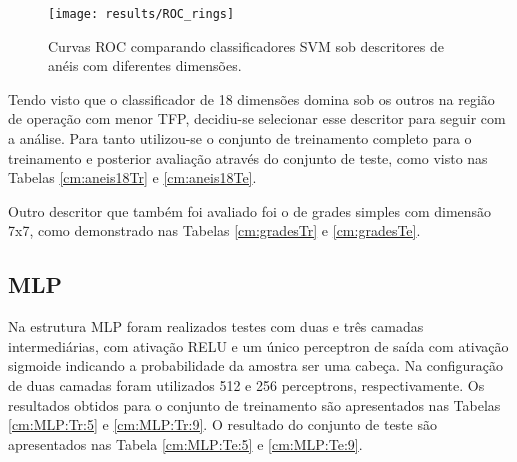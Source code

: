 \begin{table}
\end{table}

\begin{figure}
\centering
\texttt{[image: results/ROC\_rings]}
\caption{Curvas ROC comparando classificadores SVM sob descritores de anéis com diferentes dimensões.}
\label{fig:roc-rings}
\end{figure}

Tendo visto que o classificador de 18 dimensões domina sob os outros na região de operação com menor TFP, decidiu-se selecionar esse descritor para seguir com a análise. Para tanto utilizou-se o conjunto de treinamento completo para o treinamento e posterior avaliação através do conjunto de teste, como visto nas Tabelas \ref{cm:aneis18Tr} e \ref{cm:aneis18Te}.

\begin{table}
\end{table}

Outro descritor que também foi avaliado foi o de grades simples com dimensão 7x7, como demonstrado nas Tabelas \ref{cm:gradesTr} e \ref{cm:gradesTe}.

\begin{table}
\end{table}

\subsection{MLP}
Na estrutura MLP foram realizados testes com duas e três camadas intermediárias, com ativação RELU e um único perceptron de saída com ativação sigmoide indicando a probabilidade da amostra ser uma cabeça. Na configuração de duas camadas foram utilizados 512 e 256 perceptrons, respectivamente. Os resultados obtidos para o conjunto de treinamento são apresentados nas Tabelas \ref{cm:MLP:Tr:5} e \ref{cm:MLP:Tr:9}. O resultado do conjunto de teste são apresentados nas Tabela \ref{cm:MLP:Te:5} e \ref{cm:MLP:Te:9}.

